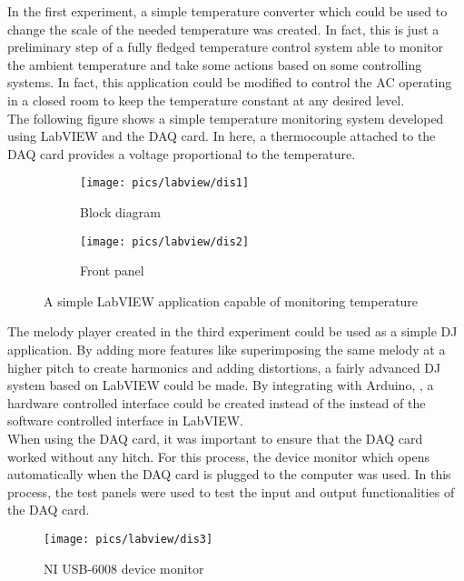\noindent
In the first experiment, a simple temperature converter which could be used to change the scale of the needed temperature was created. In fact, this is just a preliminary step of a fully fledged temperature control system able to monitor the ambient temperature and take some actions based on some controlling systems. In fact, this application could be modified to control the AC operating in a closed room to keep the temperature constant at any desired level.\\

\noindent
The following figure shows a simple temperature monitoring system developed using LabVIEW and the DAQ card. In here, a thermocouple attached to the DAQ card provides a voltage proportional to the temperature.

\begin{figure}[!h]
	\centering
	\begin{subfigure}{.5\textwidth}
		\centering
		\texttt{[image: pics/labview/dis1]}
		\caption{Block diagram}
		\label{fig:sub1}
	\end{subfigure}%
	\begin{subfigure}{.5\textwidth}
		\centering
		\texttt{[image: pics/labview/dis2]}
		\caption{Front panel}
		\label{fig:sub2}
	\end{subfigure}
	\caption{A simple LabVIEW application capable of monitoring temperature}
	\label{fig:animals}
\end{figure}

\noindent
The melody player created in the third experiment could be used as a simple DJ application. By adding more features like superimposing the same melody at a higher pitch to create harmonics and adding  distortions, a fairly advanced DJ system based on LabVIEW could be made. By integrating with Arduino, , a hardware controlled interface could be created instead of the instead of the software controlled interface in LabVIEW.\\

\noindent
When using the DAQ card, it was important to ensure that the DAQ card worked without any hitch. For this process, the device monitor which opens automatically when the DAQ card is plugged to the computer was used. In this process, the test panels were used to test the input and output functionalities of the DAQ card.

\begin{figure}[!h]
	\centering
	\texttt{[image: pics/labview/dis3]}
	\caption{NI USB-6008 device monitor}
	\label{fig:dis3}
\end{figure}

